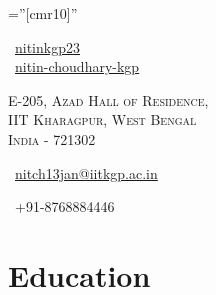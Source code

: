 \documentclass[a4paper,10pt]{extarticle} %
\begin{document}
\pagestyle{empty} %

\font\fb=''[cmr10]'' %

\begin{multicols}{3}
\normalsize \faGithub\ {\href{https://github.com/nitinkgp23}{nitinkgp23}}\\
\normalsize  \faLinkedinSquare\ {\href{https://www.linkedin.com/in/nitin-choudhary-kgp}{nitin-choudhary-kgp}}\\
\columnbreak
\normalsize\par{\par} %
\par{\centering\normalsize {\textsc{E-205, Azad Hall of Residence, \\ IIT Kharagpur, West Bengal\\ India - 721302}}\hfill\par}
\columnbreak
\raggedright\hfill\normalsize \faEnvelope\ {\href{mailto:nitch13jan@iitkgp.ac.in}{nitch13jan@iitkgp.ac.in}}\\
\raggedright\hfill{\faPhone\ +91-8768884446}
\end{multicols}


\vspace{-0.6cm}
\section{Education}
\end{document}
